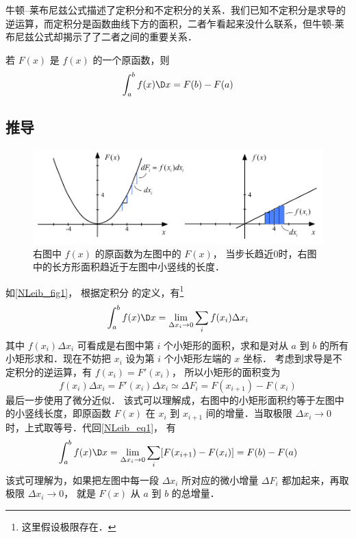 
牛顿--莱布尼兹公式描述了定积分和不定积分的关系．我们已知不定积分是求导的逆运算，而定积分是函数曲线下方的面积，二者乍看起来没什么联系，但牛顿-莱布尼兹公式却揭示了了二者之间的重要关系．

若 $F(x)$ 是 $f(x)$ 的一个原函数，则
\begin{equation}\label{NLeib_eq1}
\int_a^b {f(x)\D x}  = F(b) - F(a)
\end{equation}

\subsection{推导}
\begin{figure}[h]
\centering
\includegraphics[width=13cm]{./figures/NLeib.pdf}
\caption{右图中 $f(x)$ 的原函数为左图中的 $F(x)$， 当步长趋近0时，右图中的长方形面积趋近于左图中小竖线的长度．}\label{NLeib_fig1}
\end{figure}

如\autoref{NLeib_fig1}， 根据定积分 的定义，有\footnote{这里假设极限存在．}
\begin{equation}
\int_a^b f(x)\D x= \lim\limits_{\Delta x_i\to 0}\sum\limits_i f(x_i)\Delta x_i
\end{equation}
其中 $f(x_i)\Delta x_i$ 可看成是右图中第 $i$ 个小矩形的面积，求和是对从 $a$ 到 $b$ 的所有小矩形求和．现在不妨把 $x_i$ 设为第 $i$ 个小矩形左端的 $x$ 坐标． 考虑到求导是不定积分的逆运算，有 $f(x_i)=F'(x_i)$， 所以小矩形的面积变为
\begin{equation}
f(x_i)\Delta x_i = F'(x_i)\Delta x_i \simeq \Delta F_i = F(x_{i+1})-F(x_i)
\end{equation}
最后一步使用了微分近似． %
该式可以理解成，右图中的小矩形面积约等于左图中的小竖线长度，即原函数 $F(x)$ 在 $x_i$ 到 $x_{i+1}$ 间的增量．当取极限 $\Delta x_i \to 0$ 时，上式取等号．代回\autoref{NLeib_eq1}， 有
\begin{equation}
\int_a^b f(x)\D x= \lim\limits_{\Delta x_i\to 0}\sum\limits_i [F(x_{i+1})-F(x_i)] = F(b)-F(a)
\end{equation}
该式可理解为，如果把左图中每一段 $\Delta x_i$ 所对应的微小增量 $\Delta F_i$ 都加起来，再取极限 $\Delta x_i \to 0$， 就是 $F(x)$ 从 $a$ 到 $b$ 的总增量．


